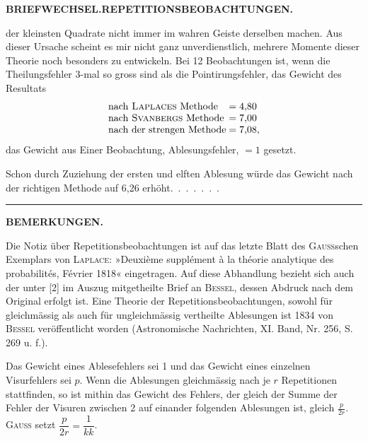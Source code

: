 \par\clearpage
\noindent{}\hfill{\small\textbf{BRIEFWECHSEL.\quad REPETITIONSBEOBACHTUNGEN.}}\hfill\null\par\medskip
\noindent der kleinsten Quadrate nicht immer im wahren Geiste derselben machen. Aus dieser Ursache scheint es mir nicht ganz unverdienstlich, mehrere Momente dieser Theorie noch besonders zu entwickeln. Bei 12 Beobachtungen ist, wenn die Theilungsfehler 3-mal so gross sind als die Pointirungsfehler, das Gewicht des Resultats
\[
\begin{array}{l@{\;}c@{\;}l}
\text{nach \textsc{Laplaces} Methode}&=&4{,}80\\
\text{nach \textsc{Svanbergs} Methode}&=&7{,}00\\
\text{nach der strengen Methode}&=&7{,}08,
\end{array}
\]
\noindent das Gewicht aus Einer Beobachtung,  Ablesungsfehler, $=1$ gesetzt.
\par\noindent\hspace*{\parindent}Schon durch Zuziehung der ersten und elften Ablesung würde das Gewicht nach der richtigen Methode auf 6,26 erhöht.\ .\ .\ .\ .\ .\ .
\begin{center}\rule{2.7cm}{.4pt}\end{center}
\begingroup\small
\begin{center}\textbf{BEMERKUNGEN.}\end{center}
\par\noindent\hspace*{\parindent}Die Notiz über Repetitionsbeobachtungen ist auf das letzte Blatt des \textsc{Gauss}schen Exemplars von \textsc{Laplace}: »Deuxième supplément à la théorie analytique des probabilités, Février 1818« eingetragen. Auf diese Abhandlung bezieht sich auch der unter [2] im Auszug mitgetheilte Brief an \textsc{Bessel}, dessen Abdruck nach dem Original erfolgt ist. Eine Theorie der Repetitionsbeobachtungen, sowohl für gleichmässig als auch für ungleichmässig vertheilte Ablesungen ist 1834 von \textsc{Bessel} veröffentlicht worden (Astronomische Nachrichten, XI. Band, Nr. 256, S. 269 u. f.).
\par\noindent\hspace*{\parindent}Das Gewicht eines Ablesefehlers sei 1 und das Gewicht eines einzelnen Visurfehlers sei $p$. Wenn die Ablesungen gleichmässig nach je $r$ Repetitionen stattfinden, so ist mithin das Gewicht des Fehlers, der gleich der Summe der Fehler der Visuren zwischen 2 auf einander folgenden Ablesungen ist, gleich $\frac{p}{2r}$. \textsc{Gauss} setzt $\dfrac{p}{2r}=\dfrac1{kk}$.
